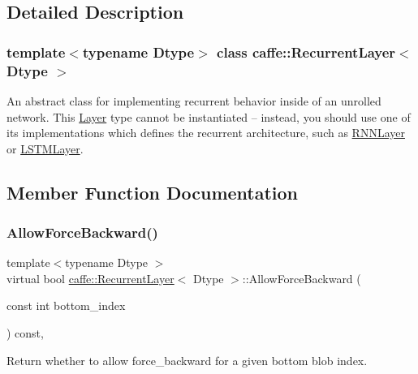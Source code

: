 \subsection{Detailed Description}
\subsubsection*{template$<$typename Dtype$>$\newline
class caffe\+::\+Recurrent\+Layer$<$ Dtype $>$}

An abstract class for implementing recurrent behavior inside of an unrolled network. This \mbox{\hyperlink{classcaffe_1_1_layer}{Layer}} type cannot be instantiated -- instead, you should use one of its implementations which defines the recurrent architecture, such as \mbox{\hyperlink{classcaffe_1_1_r_n_n_layer}{R\+N\+N\+Layer}} or \mbox{\hyperlink{classcaffe_1_1_l_s_t_m_layer}{L\+S\+T\+M\+Layer}}. 

\subsection{Member Function Documentation}
\mbox{\label{classcaffe_1_1_recurrent_layer_a8d91610cc8b9615a1db4f07fe5590a37}} 
\subsubsection{\texorpdfstring{Allow\+Force\+Backward()}{AllowForceBackward()}\hspace{0.1cm}{\footnotesize\ttfamily [1/2]}}
{\footnotesize\ttfamily template$<$typename Dtype $>$ \\
virtual bool \mbox{\hyperlink{classcaffe_1_1_recurrent_layer}{caffe\+::\+Recurrent\+Layer}}$<$ Dtype $>$\+::Allow\+Force\+Backward (\begin{DoxyParamCaption}\item[{const int}]{bottom\+\_\+index }\end{DoxyParamCaption}) const\hspace{0.3cm}{\ttfamily [inline]}, {\ttfamily [virtual]}}



Return whether to allow force\+\_\+backward for a given bottom blob index. 

